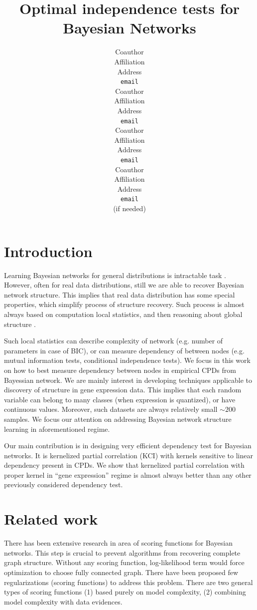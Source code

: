 \documentclass{article} %
\title{Optimal independence tests for Bayesian Networks}
\author{
\And
Coauthor \\
Affiliation \\
Address \\
\texttt{email} \\
\AND
Coauthor \\
Affiliation \\
Address \\
\texttt{email} \\
\And
Coauthor \\
Affiliation \\
Address \\
\texttt{email} \\
\And
Coauthor \\
Affiliation \\
Address \\
\texttt{email} \\
(if needed)\\
}
\begin{document}
\maketitle

\begin{abstract}

\end{abstract}


\section{Introduction}
Learning Bayesian networks for general distributions is
intractable task \cite{chickering1996learning}. However, often
for real data distributions, still we are able to 
recover Bayesian network structure. This implies that real data
distribution has some special properties, which simplify process
of structure recovery. Such process is almost always
based on computation local statistics, and then 
reasoning about global structure \cite{jaakkola2010learning, tsamardinos2006max}. 


Such local statistics can describe
complexity of network (e.g. number of parameters in case of BIC\cite{schwarz1978estimating}), or
can measure dependency of between nodes (e.g. mutual information tests, 
conditional independence tests). 
We focus in this work on how to best measure dependency between nodes
in empirical CPDs from Bayessian network. We are mainly interest
in developing techniques applicable to discovery of structure
in gene expression data. This implies that each random variable
can belong to many classes (when expression is quantized), or have continuous
values. Moreover, such datasets are always relatively small $\sim200$ samples.
We focus our attention on addressing Bayesian network structure learning
in aforementioned regime. 


Our main contribution is in designing very efficient dependency test
for Bayesian networks. It is kernelized partial correlation (KCI) with
kernels sensitive to linear dependency present in CPDs. We show
that kernelized partial correlation with proper kernel in ``gene expression''
regime is almost always better than any other previously considered
dependency test. 


\section{Related work}
There has been extensive research in area of scoring functions for
Bayesian networks. This step is crucial to prevent algorithms from 
recovering complete graph structure.
Without any scoring function, log-likelihood term would force optimization
to choose fully connected graph. There have been proposed few regularizations (scoring functions)
to address this problem. There are two general types of scoring functions 
(1) based purely on model complexity, (2) combining model complexity with data evidences.
\end{document}
